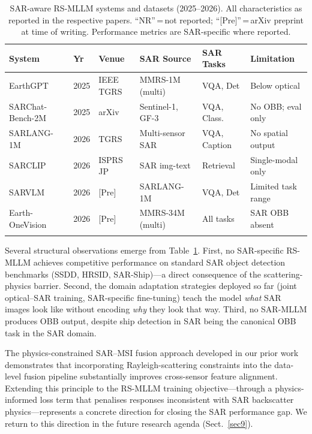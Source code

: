 \begin{table}[h]
\caption{SAR-aware RS-MLLM systems and datasets (2025--2026). All characteristics
as reported in the respective papers. ``NR''\,=\,not reported;
``[Pre]''\,=\,arXiv preprint at time of writing.
Performance metrics are SAR-specific where reported.}\label{tab:sar_mllm2}
\small\setlength\tabcolsep{4pt}
\begin{tabular*}{\textwidth}{@{\extracolsep\fill}p{2.4cm}llp{2.2cm}p{2.2cm}p{2.0cm}}
\toprule
\textbf{System} & \textbf{Yr} & \textbf{Venue} &
\textbf{SAR Source} & \textbf{SAR Tasks} & \textbf{Limitation} \\
\midrule
EarthGPT~\cite{earthgpt2025}
  & 2025 & IEEE TGRS & MMRS-1M (multi)
  & VQA, Det & Below optical \\
SARChat-Bench-2M~\cite{sarchatchat2025}
  & 2025 & arXiv & Sentinel-1, GF-3
  & VQA, Class. & No OBB; eval only \\
SARLANG-1M~\cite{sarlang2026}
  & 2026 & TGRS & Multi-sensor SAR
  & VQA, Caption & No spatial output \\
SARCLIP~\cite{sarclip2026}
  & 2026 & ISPRS JP & SAR img-text
  & Retrieval & Single-modal only \\
SARVLM~\cite{sarvlm2026}
  & 2026 & [Pre] & SARLANG-1M & VQA, Det
  & Limited task range \\
Earth-OneVision~\cite{earthonevision2026}
  & 2026 & [Pre] & MMRS-34M (multi) & All tasks
  & SAR OBB absent \\
\botrule
\end{tabular*}
\end{table}

Several structural observations emerge from Table~\ref{tab:sar_mllm2}. First,
no SAR-specific RS-MLLM achieves competitive performance on standard SAR object
detection benchmarks (SSDD, HRSID, SAR-Ship)---a direct consequence of the
scattering-physics barrier. Second, the domain adaptation strategies deployed
so far (joint optical--SAR training, SAR-specific fine-tuning) teach the model
\emph{what} SAR images look like without encoding \emph{why} they look that way.
Third, no SAR-MLLM produces OBB output, despite ship detection in SAR being the
canonical OBB task in the SAR domain.

The physics-constrained SAR--MSI fusion approach developed in our prior
work~\cite{rayleigh2026} demonstrates that incorporating Rayleigh-scattering
constraints into the data-level fusion pipeline substantially improves
cross-sensor feature alignment. Extending this principle to the RS-MLLM
training objective---through a physics-informed loss term that penalises
responses inconsistent with SAR backscatter physics---represents a concrete
direction for closing the SAR performance gap. We return to this direction
in the future research agenda (Sect.~\ref{sec9}).

